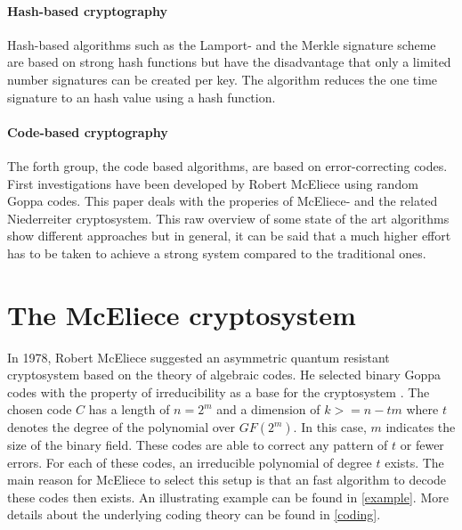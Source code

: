 \paragraph*{Hash-based cryptography}
Hash-based algorithms such as the Lamport- \cite{lamport1979constructing} and the Merkle \cite{merkle1979secrecy} signature scheme are based on strong hash functions but have the disadvantage that only a limited number signatures can be created per key. The algorithm reduces the one time signature to an hash value using a hash function\cite{bernstein2009introduction}.

\paragraph*{Code-based cryptography}
The forth group, the code based algorithms, are based on error-correcting codes. First investigations have been developed by Robert McEliece using random Goppa codes\cite{engelbert2007summary}. This paper deals with the properies of McEliece- and the related Niederreiter cryptosystem\cite{bernstein2009introduction}\cite{sendrier2011niederreiter}.
\newline
\newline
This raw overview of some state of the art algorithms show different approaches but in general, it can be said that a much higher effort has to be taken to achieve a strong system compared to the traditional ones. 

\section{The McEliece cryptosystem}
\label{mceliece}
In 1978, Robert McEliece suggested an asymmetric quantum resistant cryptosystem based on the theory of algebraic codes. He selected binary Goppa codes with the property of irreducibility as a base for the cryptosystem \cite{mceliece1978public}. The chosen code $C$ has a length of $n = 2^m$ and a dimension of $k >= n - tm$ where $t$ denotes the degree of the polynomial over $GF(2^m)$. In this case, $m$ indicates the size of the binary field. These codes are able to correct any pattern of $t$ or fewer errors. 
For each of these codes, an irreducible polynomial of degree $t$ exists. 
The main reason for McEliece to select this setup is that an fast algorithm to decode these codes \cite{mceliece2002theory} then exists. An illustrating example can be found in \autoref{example}. More details about the underlying coding theory can be found in \autoref{coding}.

